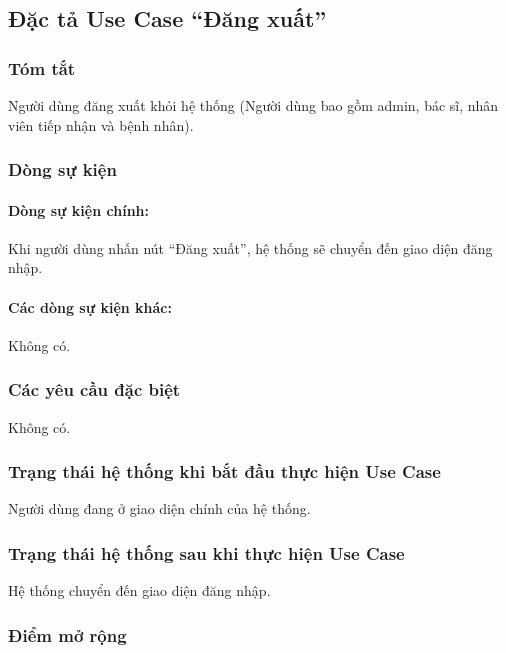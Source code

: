 \subsection{Đặc tả Use Case ``Đăng xuất''}

\subsubsection{Tóm tắt}
Người dùng đăng xuất khỏi hệ thống (Người dùng bao gồm admin, bác sĩ, nhân viên tiếp nhận và bệnh nhân).

\subsubsection{Dòng sự kiện}
\paragraph{\textbf{Dòng sự kiện chính:}}
Khi người dùng nhấn nút ``Đăng xuất'', hệ thống sẽ chuyển đến giao diện đăng nhập.

\paragraph{\textbf{Các dòng sự kiện khác:}}
Không có.

\subsubsection{Các yêu cầu đặc biệt}
Không có.

\subsubsection{Trạng thái hệ thống khi bắt đầu thực hiện Use Case}
Người dùng đang ở giao diện chính của hệ thống.

\subsubsection{Trạng thái hệ thống sau khi thực hiện Use Case}
Hệ thống chuyển đến giao diện đăng nhập.

\subsubsection{Điểm mở rộng}
